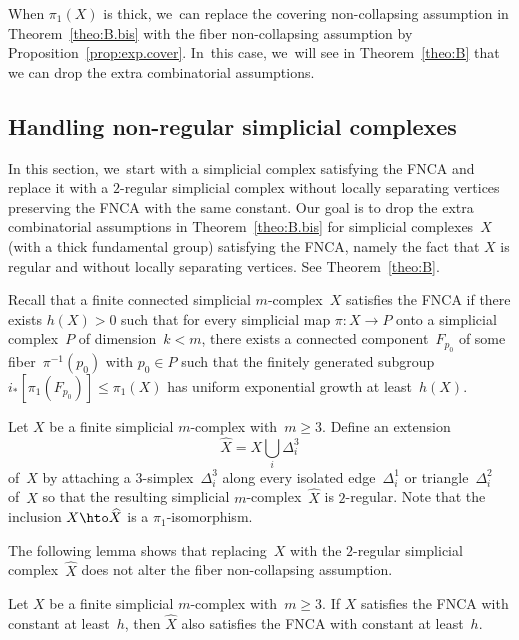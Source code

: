 \begin{remark}
When $\pi_1(X)$ is thick, we~can replace the covering non-collapsing assumption in Theorem~\ref{theo:B.bis} with the fiber non-collapsing assumption by Proposition~\ref{prop:exp.cover}. In~this case, we~will see in Theorem~\ref{theo:B} that we can drop the extra combinatorial assumptions.
\end{remark}

\subsection{Handling non-regular simplicial complexes} \label{sec:non-regular}

In this section, we~start with a simplicial complex satisfying the FNCA and replace it with a $2$-regular simplicial complex without locally separating vertices preserving the FNCA with the same constant.
Our goal is to drop the extra combinatorial assumptions in Theorem~\ref{theo:B.bis} for simplicial complexes~$X$ (with a thick fundamental group) satisfying the FNCA, namely the fact that $X$ is regular and without locally separating vertices.
See Theorem~\ref{theo:B}.

Recall that a finite connected simplicial $m$\nobreakdash-complex~$X$ satisfies the FNCA if there exists $h(X)>0$ such that for every simplicial map $\pi:X \to P$ onto a simplicial complex~$P$ of dimension~$k < m$, there exists a connected component~$F_{p_0}$ of some fiber~$\pi^{-1}(p_0)$ with $p_0 \in P$ such that the finitely generated subgroup~$i_*[\pi_1(F_{p_0})] \leqslant \pi_1(X)$ has uniform exponential growth at least~$h(X)$.

Let $X$ be a finite simplicial $m$\nobreakdash-complex with~$m \geq 3$.
Define an extension
\begin{equation} \label{eq:hatX}
\widehat{X} = X \bigcup_i \Delta_i^3
\end{equation}
of~$X$ by attaching a $3$-simplex~$\Delta_i^3$ along every isolated edge~$\Delta_i^1$ or triangle~$\Delta_i^2$ of~$X$ so that the resulting simplicial $m$\nobreakdash-complex~$\widehat{X}$ is $2$-regular.
Note that the inclusion $X \hto \widehat{X}$ is a $\pi_1$-isomorphism.

The following lemma shows that replacing~$X$ with the $2$-regular simplicial complex~$\widehat{X}$ does not alter the fiber non-collapsing assumption.

\begin{lemma} \label{lem:hat}
Let $X$ be a finite simplicial $m$\nobreakdash-complex with~$m \geq 3$.
If $X$ satisfies the FNCA with constant at least~$h$, then $\widehat{X}$ also satisfies the FNCA with constant at least~$h$.
\end{lemma}

